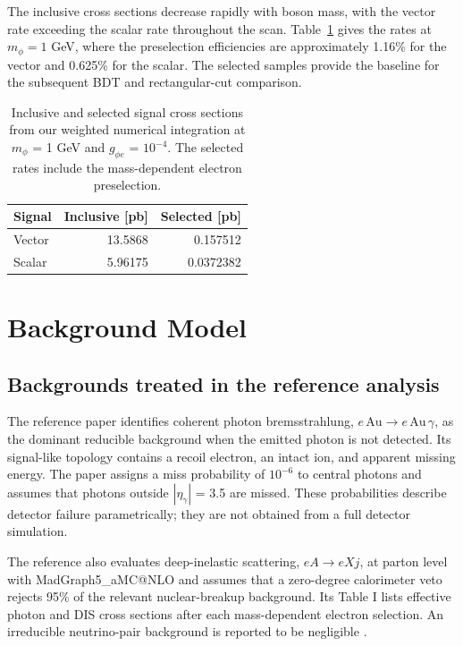 \documentclass[particles,article,submit,moreauthors,pdftex]{Definitions/mdpi}
\begin{document}
The inclusive cross sections decrease rapidly with boson mass, with the vector rate exceeding the scalar rate throughout the scan. Table~\ref{tab:1} gives the rates at $m_\phi=1$ GeV, where the preselection efficiencies are approximately 1.16\% for the vector and 0.625\% for the scalar. The selected samples provide the baseline for the subsequent BDT and rectangular-cut comparison.

\begin{table}[!htbp]
\caption{Inclusive and selected signal cross sections from our weighted numerical integration at $m_\phi$ = 1 GeV and $g_{\phi e}$ = $10^{-4}$. The selected rates include the mass-dependent electron preselection.}\label{tab:1}
\centering\small\setlength{\tabcolsep}{3pt}
\begin{tabular}{lrr}
\toprule
Signal & Inclusive [pb] & Selected [pb] \\
\midrule
Vector & 13.5868 & 0.157512 \\
Scalar & 5.96175 & 0.0372382 \\
\bottomrule\end{tabular}
\end{table}

\section{Background Model}\label{sec:3}

\subsection{Backgrounds treated in the reference analysis}\label{sec:3.1}

The reference paper identifies coherent photon bremsstrahlung, $e\,\mathrm{Au}\to e\,\mathrm{Au}\,\gamma$, as the dominant reducible background when the emitted photon is not detected. Its signal-like topology contains a recoil electron, an intact ion, and apparent missing energy. The paper assigns a miss probability of $10^{-6}$ to central photons and assumes that photons outside $|\eta_\gamma|$ = 3.5 are missed. These probabilities describe detector failure parametrically; they are not obtained from a full detector simulation.

The reference also evaluates deep-inelastic scattering, $eA\to eXj$, at parton level with MadGraph5\_aMC@NLO and assumes that a zero-degree calorimeter veto rejects 95\% of the relevant nuclear-breakup background. Its Table I lists effective photon and DIS cross sections after each mass-dependent electron selection. An irreducible neutrino-pair background is reported to be negligible \citep{ref1}.
\end{document}
